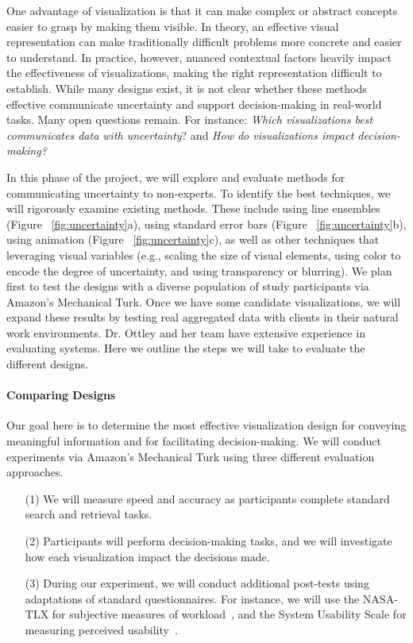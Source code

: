 One advantage of visualization is that it can make complex or abstract concepts easier to grasp by making them visible. In theory, an effective visual representation can make traditionally difficult problems more concrete and easier to understand. 
In practice, however, nuanced contextual factors heavily impact the effectiveness of visualizations, making the right representation difficult to establish.
While many designs exist, it is not clear whether these methods effective communicate uncertainty and support decision-making in real-world tasks.
Many open questions remain. For instance: \textit{Which visualizations best communicates data with uncertainty}? and \textit{How do
visualizations impact decision-making?}

In this phase of the project, we will explore and evaluate methods for communicating uncertainty to non-experts.
To identify the best techniques, we will rigorously examine existing methods. 
These include using line ensembles (Figure ~\ref{fig:uncertainty}a), using standard error bars (Figure ~\ref{fig:uncertainty}b), using animation (Figure ~\ref{fig:uncertainty}c), as well as other techniques that leveraging visual variables (e.g., scaling the size of visual elements, using color to encode the degree of uncertainty, and using transparency or blurring). 
We plan first to test the designs with a diverse population of study participants via Amazon's Mechanical Turk. 
Once we have some candidate visualizations, we will expand these results by testing real aggregated data with clients in their natural work environments.
Dr. Ottley and her team have extensive experience in evaluating systems.
Here we outline the steps we will take to evaluate the different designs.   

\paragraph{Comparing Designs} 
Our goal here is to determine the most effective visualization design for conveying meaningful information and for facilitating decision-making.  
We will conduct experiments via Amazon's Mechanical Turk using three different evaluation approaches.
\begin{itemize}
\item[(1)] We will measure speed and accuracy as participants complete standard search and retrieval tasks.
\item[(2)] Participants will perform decision-making tasks, and we will investigate how each visualization impact the decisions made.
\item[(3)] During our experiment, we will conduct additional post-tests using adaptations of standard questionnaires. For instance, we will use the NASA-TLX for subjective measures of workload~\cite{hart1988development}, and the System Usability Scale for measuring perceived usability~\cite{bangor2008empirical}. 
\end{itemize}

